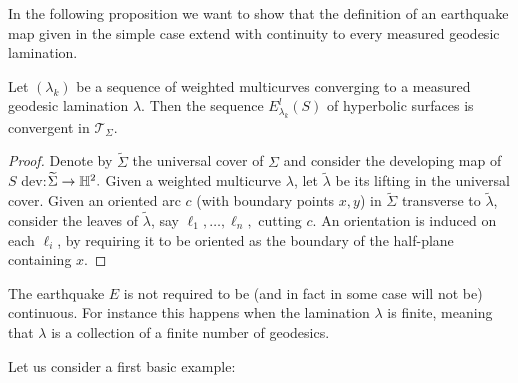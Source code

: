 In the following proposition we want to show that the definition of an earthquake map given in the simple case extend with continuity to every measured geodesic lamination. 

\begin{proposition}
    Let $(\lambda_k)$ be a sequence of weighted multicurves converging to a measured geodesic lamination $\lambda$. Then the sequence $E_{\lambda_k}^l(S)$ of hyperbolic surfaces is convergent in $\mathcal{T}_\Sigma.$
\end{proposition}

\begin{proof}
Denote by $\widetilde{\Sigma}$ the universal cover of $\Sigma$ and consider the developing map of $S$ dev:$\widetilde{\Sigma}\to\mathbb{H}^2.$ Given a weighted multicurve $\lambda$, let $\widetilde{\lambda}$ be its lifting in the universal cover. Given an oriented arc $c$ (with boundary points $x,y$) in $\widetilde{\Sigma}$ transverse to $\widetilde{\lambda}$, consider the leaves of $\widetilde{\lambda}$, say $\ell_1,\dots,\ell_n,$ cutting $c$. An orientation is induced on each $\ell_i$, by requiring it to be oriented as the boundary of the half-plane containing $x$.      
\end{proof}
\begin{observation} The earthquake $E$ is not required to be (and in fact in some case will not be) continuous. For instance this happens when the lamination $\lambda$ is finite, meaning that $\lambda$ is a collection of a finite number of geodesics. 
\end{observation}

Let us consider a first basic example: 

